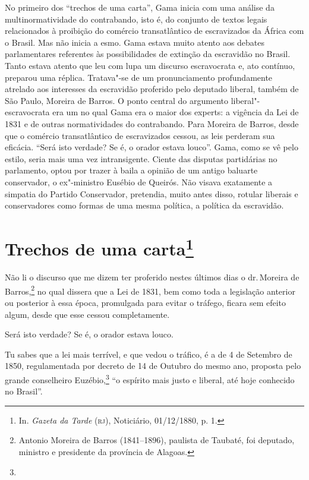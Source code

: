 \pagebreak
\mbox{}\vfill
\thispagestyle{empty}

{\small\noindent
No primeiro dos ``trechos de uma carta'', Gama inicia com uma
análise da multinormatividade do contrabando, isto é, do conjunto de
textos legais relacionados à proibição do comércio transatlântico de
escravizados da África com o Brasil. Mas não inicia a esmo. Gama estava
muito atento aos debates parlamentares referentes às possibilidades de
extinção da escravidão no Brasil. Tanto estava atento que leu com lupa
um discurso escravocrata e, ato contínuo, preparou uma réplica.
Tratava"-se de um pronunciamento profundamente atrelado aos interesses da
escravidão proferido pelo deputado liberal, também de São Paulo, Moreira
de Barros. O ponto central do argumento liberal"-escravocrata era um no
qual Gama era o maior dos experts: a vigência da Lei de 1831 e de outras
normatividades do contrabando. Para Moreira de Barros, desde que o
comércio transatlântico de escravizados cessou, as leis perderam sua
eficácia. ``Será isto verdade? Se é, o orador estava louco''. Gama, como
se vê pelo estilo, seria mais uma vez intransigente. Ciente das disputas
partidárias no parlamento, optou por trazer à baila a opinião de um
antigo baluarte conservador, o ex"-ministro Eusébio de Queirós. Não
visava exatamente a simpatia do Partido Conservador, pretendia, muito
antes disso, rotular liberais e conservadores como formas de uma mesma
política, a política da escravidão. }

\chapter{Trechos de uma carta\footnote[*]{In. \emph{Gazeta da Tarde}
  (\textsc{rj}), Noticiário, 01/12/1880, p. 1.}}


Não li o discurso que me dizem ter proferido nestes últimos dias o dr.\,Moreira de Barros,\footnote{Antonio Moreira de Barros (1841--1896),
  paulista de Taubaté, foi deputado, ministro e presidente da província
  de Alagoas.} no qual dissera que a Lei de 1831, bem como toda a
legislação anterior ou posterior à essa época, promulgada para evitar o
tráfego, ficara sem efeito algum, desde que esse cessou completamente.

Será isto verdade? Se é, o orador estava louco.

Tu sabes que a lei mais terrível, e que vedou o tráfico, é a de 4 de
Setembro de 1850, regulamentada por decreto de 14 de Outubro do mesmo
ano, proposta pelo grande conselheiro Euzébio,\footnote{} ``o espírito
mais justo e liberal, até hoje conhecido no Brasil''.


